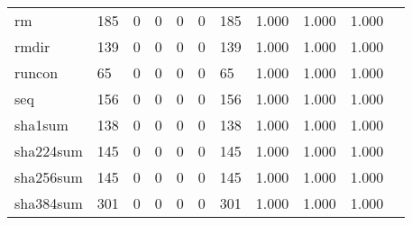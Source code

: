 \begin{longtable}{lp{1.10cm}p{1.10cm}p{1.10cm}p{1.10cm}p{1.10cm}p{1.10cm}p{1.10cm}p{1.10cm}p{1.10cm}p{1.10cm}}
rm        &                    185 &                                  0 &                                 0 &                                0 &                                 0 &                             185 &                          1.000 &                                 1.000 &                               1.000 \\
rmdir     &                    139 &                                  0 &                                 0 &                                0 &                                 0 &                             139 &                          1.000 &                                 1.000 &                               1.000 \\
runcon    &                     65 &                                  0 &                                 0 &                                0 &                                 0 &                              65 &                          1.000 &                                 1.000 &                               1.000 \\
seq       &                    156 &                                  0 &                                 0 &                                0 &                                 0 &                             156 &                          1.000 &                                 1.000 &                               1.000 \\
sha1sum   &                    138 &                                  0 &                                 0 &                                0 &                                 0 &                             138 &                          1.000 &                                 1.000 &                               1.000 \\
sha224sum &                    145 &                                  0 &                                 0 &                                0 &                                 0 &                             145 &                          1.000 &                                 1.000 &                               1.000 \\
sha256sum &                    145 &                                  0 &                                 0 &                                0 &                                 0 &                             145 &                          1.000 &                                 1.000 &                               1.000 \\
sha384sum &                    301 &                                  0 &                                 0 &                                0 &                                 0 &                             301 &                          1.000 &                                 1.000 &                               1.000 \\

\end{longtable}
